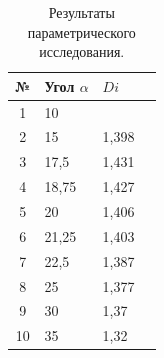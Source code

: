 \documentclass[14pt,a4paper]{article}
\begin{document}
         
         \begin{table}[!htb]
             \begin{center}
                 \caption{Результаты параметрического исследования.}
                 
                 \noindent\begin{tabular}{clll}
                     \hline
                     	№      & \hspace*{20 ex}Угол $\alpha$ &\hspace*{15 ex}$Di$	\\
                     \hline
                     \hline
                     1		& \hspace*{20 ex} 10		& \hspace*{15 ex}			\\
                     2		& \hspace*{20 ex}15			& \hspace*{15 ex}1,398		\\
                     3 		& \hspace*{20 ex}17,5		& \hspace*{15 ex}1,431		\\
                     4		& \hspace*{20 ex}18,75		& \hspace*{15 ex}1,427		\\
                     5		& \hspace*{20 ex}20			& \hspace*{15 ex}1,406		\\
                     6		& \hspace*{20 ex}21,25		& \hspace*{15 ex}1,403		\\
                     7		& \hspace*{20 ex}22,5		& \hspace*{15 ex}1,387		\\
                     8		& \hspace*{20 ex}25			& \hspace*{15 ex}1,377		\\
                     9		& \hspace*{20 ex}30			& \hspace*{15 ex}1,37		\\		
                     10		& \hspace*{20 ex}35			& \hspace*{15 ex}1,32		\\

\end{tabular}
\end{center}
\end{table}
\end{document}
